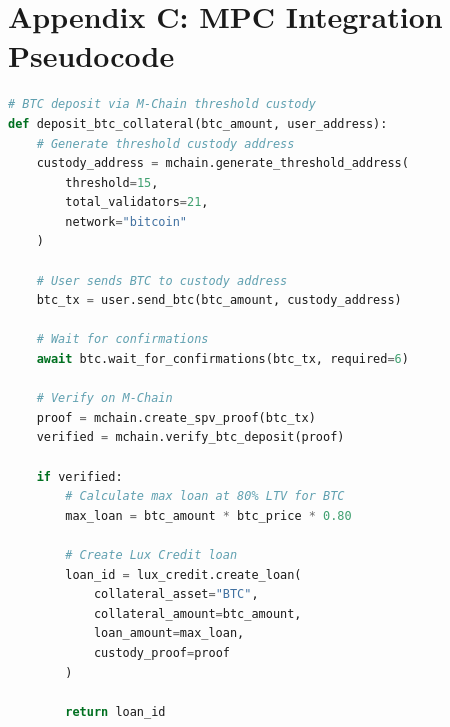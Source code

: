 \section{Appendix C: MPC Integration Pseudocode}


\begin{lstlisting}[language=Python, basicstyle=\footnotesize\ttfamily]
# BTC deposit via M-Chain threshold custody
def deposit_btc_collateral(btc_amount, user_address):
    # Generate threshold custody address
    custody_address = mchain.generate_threshold_address(
        threshold=15,
        total_validators=21,
        network="bitcoin"
    )
    
    # User sends BTC to custody address
    btc_tx = user.send_btc(btc_amount, custody_address)
    
    # Wait for confirmations
    await btc.wait_for_confirmations(btc_tx, required=6)
    
    # Verify on M-Chain
    proof = mchain.create_spv_proof(btc_tx)
    verified = mchain.verify_btc_deposit(proof)
    
    if verified:
        # Calculate max loan at 80% LTV for BTC
        max_loan = btc_amount * btc_price * 0.80
        
        # Create Lux Credit loan
        loan_id = lux_credit.create_loan(
            collateral_asset="BTC",
            collateral_amount=btc_amount,
            loan_amount=max_loan,
            custody_proof=proof
        )
        
        return loan_id
\end{lstlisting}

